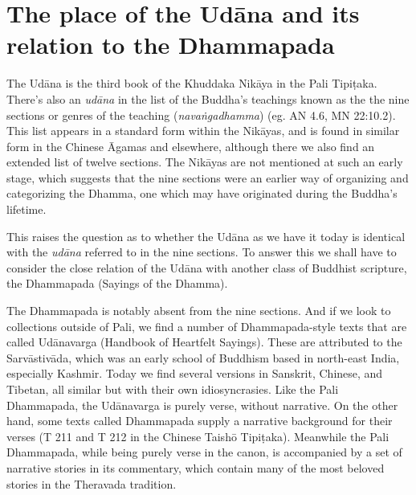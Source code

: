 \documentclass[12pt,openany]{book}%
\begin{document}
\section*{The place of the \textsanskrit{Udāna} and its relation to the Dhammapada}

The \textsanskrit{Udāna} is the third book of the Khuddaka \textsanskrit{Nikāya} in the Pali \textsanskrit{Tipiṭaka}. There’s also an \textit{\textsanskrit{udāna}} in the list of the Buddha’s teachings known as the the nine sections or genres of the teaching (\textit{\textsanskrit{navaṅgadhamma}}) (eg. AN 4.6, MN  22:10.2). This list appears in a standard form within the \textsanskrit{Nikāyas}, and is found in similar form in the Chinese Āgamas and elsewhere, although there we also find an extended list of twelve sections. The \textsanskrit{Nikāyas} are not mentioned at such an early stage, which suggests that the nine sections were an earlier way of organizing and categorizing the Dhamma, one which may have originated during the Buddha’s lifetime. 

This raises the question as to whether the \textsanskrit{Udāna} as we have it today is identical with the \textit{\textsanskrit{udāna}} referred to in the nine sections. To answer this we shall have to consider the close relation of the \textsanskrit{Udāna} with another class of Buddhist scripture, the Dhammapada (Sayings of the Dhamma). 

The Dhammapada is notably absent from the nine sections. And if we look to collections outside of Pali, we find a number of Dhammapada-style texts that are called \textsanskrit{Udānavarga} (Handbook of Heartfelt Sayings). These are attributed to the \textsanskrit{Sarvāstivāda}, which was an early school of Buddhism based in north-east India, especially Kashmir. Today we find several versions in Sanskrit, Chinese, and Tibetan, all similar but with their own idiosyncrasies. Like the Pali Dhammapada, the \textsanskrit{Udānavarga} is purely verse, without narrative. On the other hand, some texts called Dhammapada supply a narrative background for their verses (T 211 and T 212 in the Chinese Taishō \textsanskrit{Tipiṭaka}). Meanwhile the Pali Dhammapada, while being purely verse in the canon, is accompanied by a set of narrative stories in its commentary, which contain many of the most beloved stories in the Theravada tradition.
\end{document}
